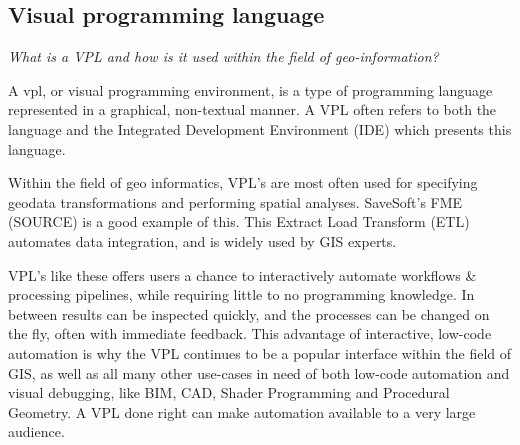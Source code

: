 \subsection*{Visual programming language}

\emph{What is a VPL and how is it used within the field of geo-information?}

A \ac{vpl}, or visual programming environment, is a type of programming language represented in a graphical, non-textual manner.
A VPL often refers to both the language and the Integrated Development Environment (IDE) which presents this language.


Within the field of geo informatics, VPL's are most often used for specifying geodata transformations and performing spatial analyses.  
SaveSoft's FME (SOURCE) is a good example of this. This Extract Load Transform (ETL) automates data integration, and is widely used by GIS experts. 




VPL's like these offers users a chance to interactively automate workflows \& processing pipelines, while requiring little to no programming knowledge. 
In between results can be inspected quickly, and the processes can be changed on the fly, often with immediate feedback.
This advantage of interactive, low-code automation is why the VPL continues to be a popular interface within the field of GIS, as well as all many other use-cases in need of both low-code automation and visual debugging, like BIM, CAD, Shader Programming and Procedural Geometry. 
A VPL done right can make automation available to a very large audience. 

